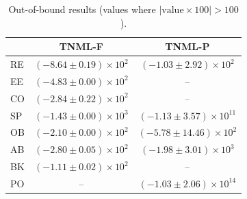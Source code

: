 \begin{table}[ht]
\centering
\small
\caption{Out-of-bound results (values where $|\text{value} \times 100| > 100$).}
\label{tab:out_of_bound}
\begin{tabular}{lcc}
\toprule
& \textbf{TNML-F} & \textbf{TNML-P} \\
\midrule
RE & $(-8.64 \pm 0.19)\times 10^{2}$ & $(-1.03 \pm 2.92)\times 10^{2}$ \\
\midrule
EE & $(-4.83 \pm 0.00)\times 10^{2}$ & -- \\
\midrule
CO & $(-2.84 \pm 0.22)\times 10^{2}$ & -- \\
\midrule
SP & $(-1.43 \pm 0.00)\times 10^{3}$ & $(-1.13 \pm 3.57)\times 10^{11}$ \\
\midrule
OB & $(-2.10 \pm 0.00)\times 10^{2}$ & $(-5.78 \pm 14.46)\times 10^{2}$ \\
\midrule
AB & $(-2.80 \pm 0.05)\times 10^{2}$ & $(-1.98 \pm 3.01)\times 10^{3}$ \\
\midrule
BK & $(-1.11 \pm 0.02)\times 10^{2}$ & -- \\
\midrule
PO & -- & $(-1.03 \pm 2.06)\times 10^{14}$ \\
\midrule
\bottomrule
\end{tabular}
\end{table}